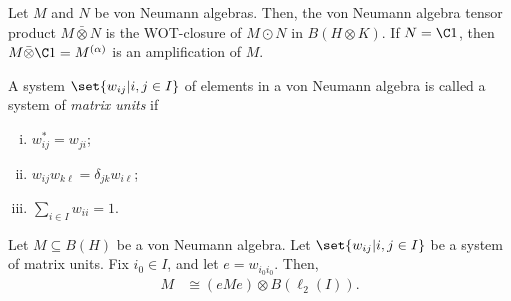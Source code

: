 \documentclass[10pt]{mypackage}
\begin{document}
\begin{definition}
  Let $M$ and $N$ be von Neumann algebras. Then, the von Neumann algebra tensor product $M\bar\otimes N$ is the WOT-closure of $M\odot N$ in $B\left( H\otimes K \right)$. If $N = \C 1$, then $M\bar\otimes \C 1 = M^{(\alpha)}$ is an amplification of $M$.
\end{definition}
\begin{definition}
  A system $\set{w_{ij}|i,j\in I}$ of elements in a von Neumann algebra is called a system of \textit{matrix units} if
  \begin{enumerate}[(i)]
    \item $w_{ij}^{\ast} = w_{ji}$;
    \item $w_{ij}w_{k\ell} = \delta_{jk}w_{i\ell}$;
    \item $\sum_{i\in I}w_{ii} = 1$.
  \end{enumerate}
\end{definition}
\begin{proposition}
  Let $M\subseteq B(H)$ be a von Neumann algebra. Let $\set{w_{ij} | i,j\in I}$ be a system of matrix units. Fix $i_0\in I$, and let $e = w_{i_0i_0}$. Then,
  \begin{align*}
    M &\cong \left( eMe \right)\otimes B\left( \ell_2(I) \right).
  \end{align*}
\end{proposition}
\end{document}
